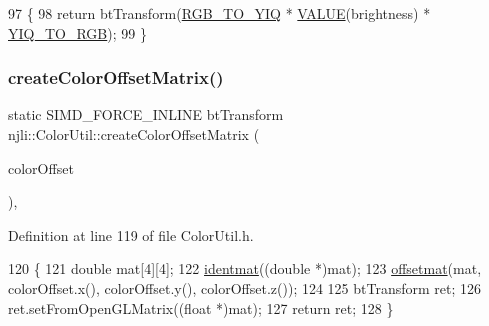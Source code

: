 \begin{DoxyCode}
97     \{
98       \textcolor{keywordflow}{return} btTransform(\mbox{\hyperlink{classnjli_1_1_color_util_ae8aa4830ab0c084398eb830628323217}{RGB\_TO\_YIQ}} * \mbox{\hyperlink{classnjli_1_1_color_util_a683449ea8eec905409c9b746858cf14d}{VALUE}}(brightness) * 
      \mbox{\hyperlink{classnjli_1_1_color_util_a9b3a5642a95a4cf7fbc782ac56acba4f}{YIQ\_TO\_RGB}});
99     \}
\end{DoxyCode}
\mbox{\label{classnjli_1_1_color_util_a2c4280f030420f1cf84d97dc4c2eba98}} 
\subsubsection{\texorpdfstring{create\+Color\+Offset\+Matrix()}{createColorOffsetMatrix()}}
{\footnotesize\ttfamily static S\+I\+M\+D\+\_\+\+F\+O\+R\+C\+E\+\_\+\+I\+N\+L\+I\+NE bt\+Transform njli\+::\+Color\+Util\+::create\+Color\+Offset\+Matrix (\begin{DoxyParamCaption}\item[{const bt\+Vector3 \&}]{color\+Offset }\end{DoxyParamCaption})\hspace{0.3cm}{\ttfamily [inline]}, {\ttfamily [static]}}



Definition at line 119 of file Color\+Util.\+h.


\begin{DoxyCode}
120     \{
121       \textcolor{keywordtype}{double} mat[4][4];
122       \mbox{\hyperlink{classnjli_1_1_color_util_af683cd23fbe9098e277248be18047422}{identmat}}((\textcolor{keywordtype}{double} *)mat);
123       \mbox{\hyperlink{classnjli_1_1_color_util_a41a9d5c0daa4ab6c0bf04aa9c66ea6d2}{offsetmat}}(mat, colorOffset.x(), colorOffset.y(), colorOffset.z());
124 
125       btTransform ret;
126       ret.setFromOpenGLMatrix((\textcolor{keywordtype}{float} *)mat);
127       \textcolor{keywordflow}{return} ret;
128     \}
\end{DoxyCode}
\mbox{\label{classnjli_1_1_color_util_a7df3c9ab1162ce070ff7ad84b8b34306}} 
